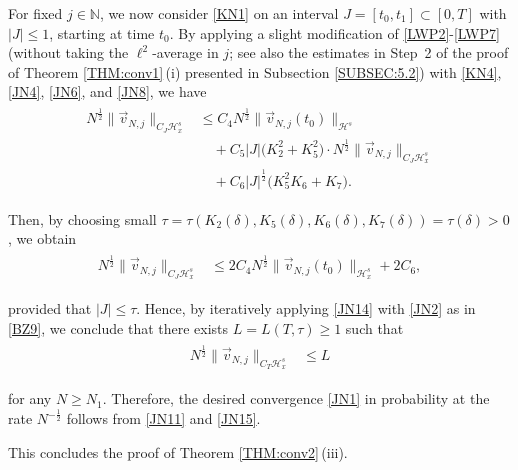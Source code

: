 \documentclass[letterpaper, 11pt,  reqno]{amsart}
\newcommand{\1}{\hspace{0.5mm}\text{I}\hspace{0.2mm}}
\newcommand{\noi}{\noindent}
\newcommand{\N}{\mathbb{N}}
\renewcommand{\H}{\mathcal{H}}
\newcommand{\dl}{\delta}
\renewcommand{\l}{\ell}
\numberwithin{equation}{section}
\numberwithin{theorem}{section}
\begin{document}
For fixed $j \in \N$, 
we now consider \eqref{KN1}
on an interval $J = [t_0, t_1]\subset [0, T]$ with $|J| \le 1$, 
 starting at time $t_0$.
By  applying a slight modification of 
\eqref{LWP2}-\eqref{LWP7}
(without taking the $\l^2$-average in $j$;
see also the estimates
in  Step~2
of the proof of Theorem \ref{THM:conv1}\,(i) presented in Subsection \ref{SUBSEC:5.2})
with  \eqref{KN4}, \eqref{JN4}, 
\eqref{JN6},
 and \eqref{JN8},
 we have 
\begin{align*}
\begin{split}
N^{\frac 12} \|\vec v_{N, j}\|_{C_J \H_x^s}
& \le 
C_4 
N^{\frac 12} \|\vec  v_{N, j} (t_0) \|_{\H^s}\\
& \quad 
+ C_5 |J|
\Big( 
 K^2_2  + K_5^2 \Big)
\cdot N^{\frac 12} \|\vec  v_{N, j}\|_{C_J \H_x^s}\\
& \quad 
+C_6 |J|^\frac 12 \Big(K_5^2 K_6 + K_7\Big).
\end{split}
\end{align*}

\noi
Then, 
by choosing small $\tau = \tau (K_2(\dl), K_5(\dl), K_6(\dl), K_7(\dl) ) = \tau(\dl) > 0$, 
we obtain
\begin{align}
\begin{split}
N^{\frac 12}\|\vec v_{N, j}\|_{C_J\H^s_x}
& \le 
2 C_4
N^{\frac 12}\|\vec  v_{N, j} (t_0) \|_{ \H^s_x} 
+2 C_6 , 
\end{split}
\label{JN14}
\end{align}

\noi
provided that $|J| \le \tau$.
Hence, by iteratively applying \eqref{JN14}
with \eqref{JN2}
as in \eqref{BZ9}, 
we conclude that 
there exists 
$L = L(T,  \tau)  \ge 1$
such that 
\begin{align}
\begin{split}
N^\frac 12 \|\vec v_{N, j}\|_{C_T\H^s_x}
& \le L
\end{split}
\label{JN15}
\end{align}


\noi
for any $N \ge N_1$.
Therefore, 
 the desired convergence 
\eqref{JN1} in probability at the rate $N^{-\frac 12}$
follows from \eqref{JN11} and \eqref{JN15}.






This concludes the proof of Theorem \ref{THM:conv2}\,(iii).
\end{document}
